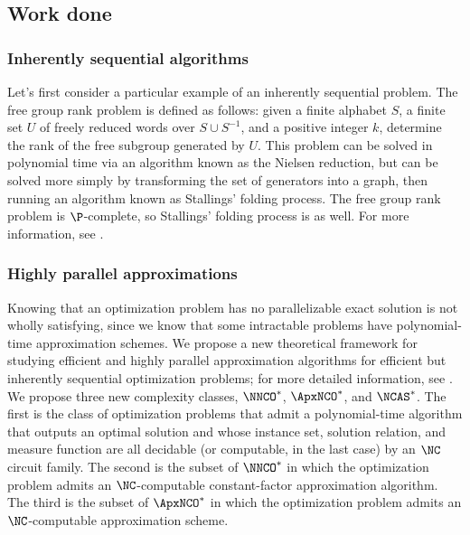 \documentclass{article}
\begin{document}
\subsection{Work done}

\subsubsection{Inherently sequential algorithms}

Let's first consider a particular example of an inherently sequential problem.
The free group rank problem is defined as follows: given a finite alphabet $S$, a finite set $U$ of freely reduced words over $S \cup S^{-1}$, and a positive integer $k$, determine the rank of the free subgroup generated by $U$.
This problem can be solved in polynomial time via an algorithm known as the Nielsen reduction, but can be solved more simply by transforming the set of generators into a graph, then running an algorithm known as Stallings' folding process.
The free group rank problem is $\P$-complete, so Stallings' folding process is as well.
For more information, see \autocite{stallings}.

\subsubsection{Highly parallel approximations}


Knowing that an optimization problem has no parallelizable exact solution is not wholly satisfying, since we know that some intractable problems have polynomial-time approximation schemes.
We propose a new theoretical framework for studying efficient and highly parallel approximation algorithms for efficient but inherently sequential optimization problems; for more detailed information, see \autocite{ncapproximation}.
We propose three new complexity classes, $\NNCO^*$, $\ApxNCO^*$, and $\NCAS^*$.
The first is the class of optimization problems that admit a polynomial-time algorithm that outputs an optimal solution and whose instance set, solution relation, and measure function are all decidable (or computable, in the last case) by an $\NC$ circuit family.
The second is the subset of $\NNCO^*$ in which the optimization problem admits an $\NC$-computable constant-factor approximation algorithm.
The third is the subset of $\ApxNCO^*$ in which the optimization problem admits an $\NC$-computable approximation scheme.
\end{document}
